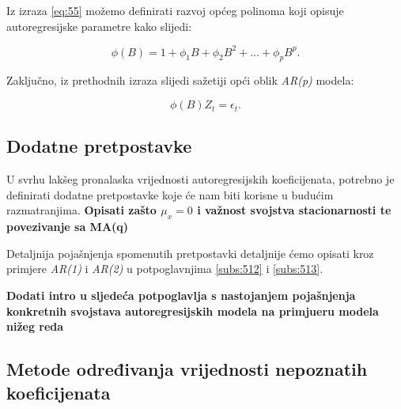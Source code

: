 \documentclass[a4paper,12pt,oneside]{memoir}
\begin{document}
            
        
            Iz izraza \ref{eq:55} možemo definirati razvoj općeg polinoma koji opisuje autoregresijske parametre kako slijedi:

            \begin{equation}
                \phi(B)=1+\phi_1B+\phi_2B^2+\ldots+\phi_pB^p.
                \label{eq:56}
            \end{equation}

            Zaključno, iz prethodnih izraza slijedi sažetiji opći oblik \textit{AR(p)} modela:

            \begin{equation}
                \phi(B)Z_t=\epsilon_t.
                \label{eq:57}
            \end{equation}

            \subsection{Dodatne pretpostavke}
            
            U svrhu lakšeg pronalaska vrijednosti autoregresijskih koeficijenata, potrebno je definirati dodatne pretpostavke koje će nam biti korisne u budućim razmatranjima. \textbf{Opisati zašto $\mu_x=0$ i važnost svojstva stacionarnosti te povezivanje sa MA(q)}
            
            
            Detaljnija pojašnjenja spomenutih pretpostavki detaljnije ćemo opisati kroz primjere \textit{AR(1)} i \textit{AR(2)} u potpoglavnjima \ref{subs:512} i \ref{subs:513}.
            
            
            


            \textbf{Dodati intro u sljedeća potpoglavlja s nastojanjem pojašnjenja konkretnih svojstava autoregresijskih modela na primjueru modela nižeg reda}

            \subsection{Metode određivanja vrijednosti nepoznatih koeficijenata}

\end{document}
